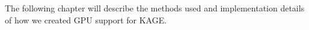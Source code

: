 The following chapter will describe the methods used and implementation details of how we created GPU support for KAGE.


